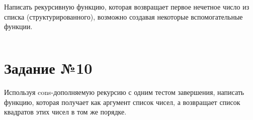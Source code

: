 Написать рекурсивную функцию, которая возвращает первое нечетное число
из списка (структурированного), возможно создавая некоторые вспомогательные
функции.

\vspace{4mm}
\begin{minipage}{0.92\linewidth}
\begin{lstlisting}
\end{lstlisting}
\end{minipage}

\section{Задание №10}

Используя cons-дополняемую рекурсию с одним тестом завершения, написать функцию,
которая получает как аргумент список чисел, а возвращает список квадратов этих
чисел в том же порядке.

\vspace{4mm}
\begin{minipage}{0.92\linewidth}
\begin{lstlisting}
\end{lstlisting}
\end{minipage}

